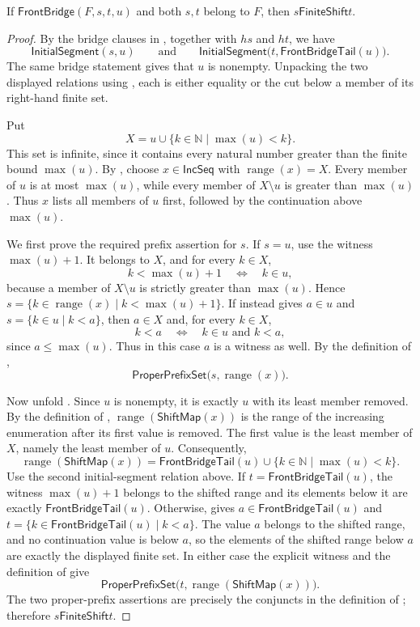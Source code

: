 \begin{lemma}
If $\mathsf{FrontBridge}(F,s,t,u)$ and both $s,t$ belong to $F$, then
$s\mathrel{\mathsf{FiniteShift}}t$.
\end{lemma}
\begin{proof}
By the bridge clauses in , together with $hs$ and
$ht$, we have
\[
  \mathsf{InitialSegment}(s,u)
  \qquad\text{and}\qquad
  \mathsf{InitialSegment}\bigl(t,\mathsf{FrontBridgeTail}(u)\bigr).
\]
The same bridge statement gives that $u$ is nonempty.  Unpacking the two
displayed relations using , each is either equality
or the cut below a member of its right-hand finite set.

Put
\[
  X=u\cup\{k\in\mathbb N\mid\max(u)<k\}.
\]
This set is infinite, since it contains every natural number greater than
the finite bound $\max(u)$.  By , choose
$x\in\mathsf{IncSeq}$ with $\operatorname{range}(x)=X$.  Every member of
$u$ is at most $\max(u)$, while every member of $X\setminus u$ is greater
than $\max(u)$.  Thus $x$ lists all members of $u$ first, followed by the
continuation above $\max(u)$.

We first prove the required prefix assertion for $s$.  If $s=u$, use the
witness $\max(u)+1$.  It belongs to $X$, and for every $k\in X$,
\[
  k<\max(u)+1\quad\Longleftrightarrow\quad k\in u,
\]
because a member of $X\setminus u$ is strictly greater than $\max(u)$.
Hence $s=\{k\in\operatorname{range}(x)\mid k<\max(u)+1\}$.  If instead
 gives $a\in u$ and
$s=\{k\in u\mid k<a\}$, then $a\in X$ and, for every $k\in X$,
\[
  k<a\quad\Longleftrightarrow\quad k\in u\text{ and }k<a,
\]
since $a\leq\max(u)$.  Thus in this case $a$ is a witness as well.  By
the definition of ,
\[
  \mathsf{ProperPrefixSet}\bigl(s,\operatorname{range}(x)\bigr).
\]

Now unfold .  Since $u$ is nonempty, it is exactly
$u$ with its least member removed.  By the definition of
, $\operatorname{range}(\mathsf{ShiftMap}(x))$ is the
range of the increasing enumeration after its first value is removed.
The first value is the least member of $X$, namely the least member of
$u$.  Consequently,
\[
  \operatorname{range}(\mathsf{ShiftMap}(x))
  =\mathsf{FrontBridgeTail}(u)\cup
    \{k\in\mathbb N\mid\max(u)<k\}.
\]
Use the second initial-segment relation above.  If
$t=\mathsf{FrontBridgeTail}(u)$, the witness $\max(u)+1$ belongs to the
shifted range and its elements below it are exactly
$\mathsf{FrontBridgeTail}(u)$.  Otherwise,  gives
$a\in\mathsf{FrontBridgeTail}(u)$ and
$t=\{k\in\mathsf{FrontBridgeTail}(u)\mid k<a\}$.  The value $a$ belongs
to the shifted range, and no continuation value is below $a$, so the
elements of the shifted range below $a$ are exactly the displayed finite
set.  In either case the explicit witness and the definition of
 give
\[
  \mathsf{ProperPrefixSet}\bigl(t,
    \operatorname{range}(\mathsf{ShiftMap}(x))\bigr).
\]
The two proper-prefix assertions are precisely the conjuncts in the
definition of ; therefore
$s\mathrel{\mathsf{FiniteShift}}t$.
\end{proof}
